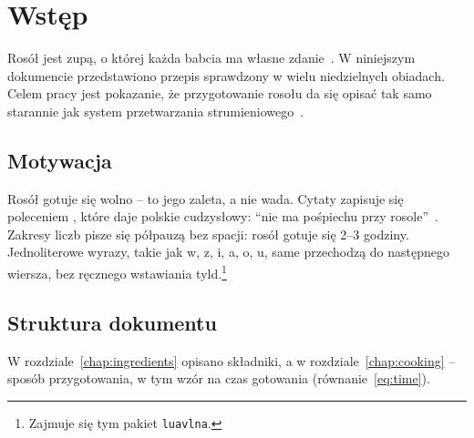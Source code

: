 \chapter{Wstęp}
\label{chap:introduction}

Rosół jest zupą, o której każda babcia ma własne zdanie~\cite{babcia1987zupy}.
W niniejszym dokumencie przedstawiono przepis sprawdzony w wielu niedzielnych obiadach.
Celem pracy jest pokazanie, że przygotowanie rosołu da się opisać tak samo starannie jak system przetwarzania strumieniowego~\cite{kuchcik2021bulion, garnek2019teoria}.

\section{Motywacja}
\label{sec:motivation}

Rosół gotuje się wolno -- to jego zaleta, a nie wada.
Cytaty zapisuje się poleceniem \code{\\enquote}, które daje polskie cudzysłowy: \enquote{nie ma pośpiechu przy rosole}~\cite[s.~12]{babcia1987zupy}.
Zakresy liczb pisze się półpauzą bez spacji: rosół gotuje się 2--3 godziny.
Jednoliterowe wyrazy, takie jak w, z, i, a, o, u, same przechodzą do następnego wiersza, bez ręcznego wstawiania tyld.\footnote{Zajmuje się tym pakiet \texttt{luavlna}.}


\section{Struktura dokumentu}
\label{sec:structure}

W rozdziale~\ref{chap:ingredients} opisano składniki, a w rozdziale~\ref{chap:cooking} -- sposób przygotowania, w tym wzór na czas gotowania (równanie~\eqref{eq:time}).
